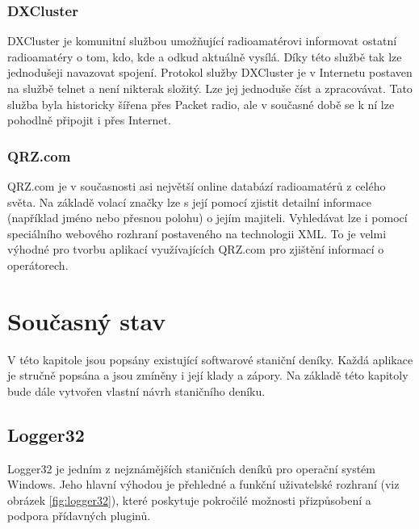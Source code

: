 \subsection{DXCluster}

DXCluster je komunitní službou umožňující radioamatérovi informovat ostatní
radioamatéry o tom, kdo, kde a odkud aktuálně vysílá. Díky této službě tak lze jednodušeji navazovat
spojení. Protokol služby DXCluster je v Internetu postaven na službě telnet a není nikterak
složitý. Lze jej jednoduše číst a zpracovávat. Tato služba byla historicky
šířena přes Packet radio, ale v současné době se k ní lze pohodlně připojit i přes
Internet.

\subsection{QRZ.com}

QRZ.com je v současnosti asi největší online databází radioamatérů z celého světa. Na základě volací značky lze s její pomocí zjistit detailní
informace (například jméno nebo přesnou polohu) o jejím majiteli. Vyhledávat lze i pomocí speciálního webového rozhraní
postaveného na technologii XML. To je velmi výhodné pro tvorbu aplikací využívajících QRZ.com pro zjištění informací o
operátorech.

\chapter{Současný stav}
\label{soucasnost}

V této kapitole jsou popsány existující softwarové staniční deníky. Každá aplikace je stručně
popsána a jsou zmíněny i její klady a zápory. Na základě této kapitoly bude dále
vytvořen vlastní návrh staničního deníku.

\section{Logger32}%

Logger32 je jedním z nejznámějších staničních deníků pro operační systém Windows. Jeho hlavní výhodou je přehledné a funkční
uživatelské rozhraní (viz obrázek \ref{fig:logger32}), které poskytuje pokročilé možnosti přizpůsobení a podpora přídavných pluginů.

